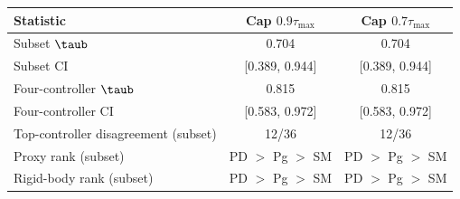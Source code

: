 \begin{tabular}{lcc}
\toprule
Statistic & Cap $0.9\tau_{\max}$ & Cap $0.7\tau_{\max}$ \\
\midrule
Subset $\taub$                         & 0.704 & 0.704 \\
Subset CI                              & [0.389, 0.944] & [0.389, 0.944] \\
Four-controller $\taub$                & 0.815 & 0.815 \\
Four-controller CI                     & [0.583, 0.972] & [0.583, 0.972] \\
Top-controller disagreement (subset)   & 12/36 & 12/36 \\
Proxy rank (subset)                    & PD $>$ Pg $>$ SM & PD $>$ Pg $>$ SM \\
Rigid-body rank (subset)               & PD $>$ Pg $>$ SM & PD $>$ Pg $>$ SM \\
\bottomrule
\end{tabular}
